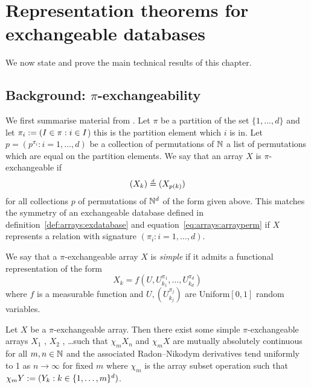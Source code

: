 \section{Representation theorems for exchangeable databases}
\label{sec:proof_database}

We now state and prove the main technical results of this chapter.

\subsection{Background: $\pi$-exchangeability}

We first summarise material from \citet{Kallenberg1999-pj}.
Let $\pi$ be a partition of the set $\{1,\dots,d\}$ and let $\pi_i := (I \in \pi : i \in I$) \ie this is the partition element which $i$ is in.
Let $p = (p^{\pi_i} : i = 1,\dots,d)$ be a collection of permutations of $\mathbb{N}$ \ie a list of permutations which are equal on the partition elements.
We say that an array $X$ is $\pi$-exchangeable if 
\begin{equation}
  (X_k) \overset{\,_{\!d}}{=} (X_{p(k)})
\end{equation}
for all collections $p$ of permutations of $\mathbb{N}^d$ of the form given above.
This matches the symmetry of an exchangeable database defined in definition~\ref{def:arrays:exdatabase} and equation~\eqref{eq:arrays:arrayperm} if $X$ represents a relation with signature $(\pi_i : i = 1,\dots,d)$.

We say that a $\pi$-exchangeable array $X$ is \emph{simple} if it admits a functional representation of the form
\begin{equation}
  X_{k} = f(U, U^{\pi_1}_{k_1}, \dots, U^{\pi_d}_{k_d})
\end{equation}
where $f$ is a measurable function and $U, (U^{\pi_j}_{k_j})$ are \iid Uniform$[0,1]$ random variables.

\begin{prop}
  \label{thm:piex}
  Let $X$ be a $\pi$-exchangeable array.
  Then there exist some simple $\pi$-exchangeable arrays $X_1$ , $X_2$ , \dots such that
  $\chi_m X_n$ and $\chi_m X$ are mutually absolutely continuous for all $m,n \in \mathbb{N}$ and the associated Radon--Nikodym derivatives tend
  uniformly to 1 as $n \to \infty$ for fixed $m$ where $\chi_m$ is the array subset operation such that $\chi_m Y := (Y_{k} : k \in \{1,\dots,m\}^d)$.
\end{prop}

